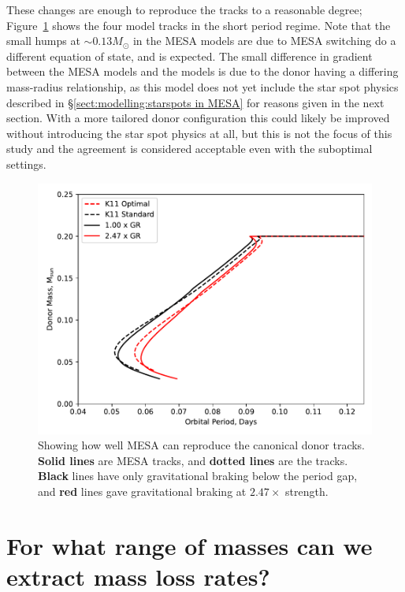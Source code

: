 These changes are enough to reproduce the \citet{knigge11} tracks to a reasonable degree; Figure~\ref{fig:results:MESA can reproduce the K11 tracks} shows the four model tracks in the short period regime.
Note that the small humps at $\sim 0.13 M_\odot$ in the MESA models are due to MESA switching do a different equation of state, and is expected.
The small difference in gradient between the MESA models and the \citet{knigge11} models is due to the donor having a differing mass-radius relationship, as this model does not yet include the star spot physics described in \S\ref{sect:modelling:starspots in MESA} for reasons given in the next section.
With a more tailored donor configuration this could likely be improved without introducing the star spot physics at all, but this is not the focus of this study and the agreement is considered acceptable even with the suboptimal settings.

\begin{figure}
    \centering
    \includegraphics[width=.9\textwidth]{figures/modelling/reproducing_K11_tracks_fspot0.000.pdf}
    \caption{Showing how well MESA can reproduce the canonical \citet{knigge11} donor tracks. {\bf Solid lines} are MESA tracks, and {\bf dotted lines} are the \citet{knigge11} tracks. {\bf Black} lines have only gravitational braking below the period gap, and {\bf red} lines gave gravitational braking at $2.47\times$ strength.}
    \label{fig:results:MESA can reproduce the K11 tracks}
\end{figure}



\section{For what range of masses can we extract mass loss rates?}
\label{sect:results:MESA massloss allowable mass range}

